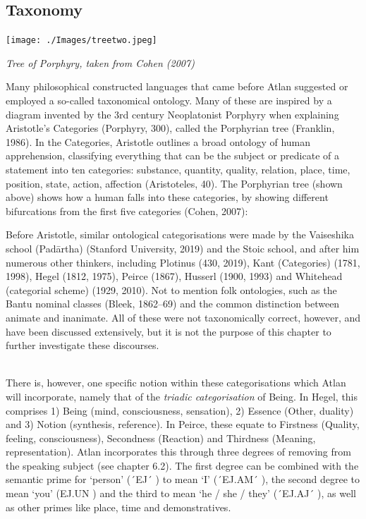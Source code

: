 \subsection{Taxonomy}

\vspace{0.3cm}
\begin{center}
\texttt{[image: ./Images/treetwo.jpeg]}

{\footnotesize \it Tree of Porphyry, taken from Cohen (2007)}
\end{center}

\noindent Many philosophical constructed languages that came before Atlan suggested or employed a so-called taxonomical ontology. Many of these are inspired by a diagram invented by the 3rd century Neoplatonist Porphyry when explaining Aristotle’s Categories (Porphyry, 300), called the Porphyrian tree (Franklin, 1986). In the Categories, Aristotle outlines a broad ontology of human apprehension, classifying everything that can be the subject or predicate of a statement into ten categories: substance, quantity, quality, relation, place, time, position, state, action, affection (Aristoteles, 40). The Porphyrian tree (shown above) shows how a human falls into these categories, by showing different bifurcations from the first five categories (Cohen, 2007): 

Before Aristotle, similar ontological categorisations were made by the Vaiseshika school (Padārtha) (Stanford University, 2019) and the Stoic school, and after him numerous other thinkers, including Plotinus (430, 2019), Kant (Categories) (1781, 1998), Hegel  (1812, 1975), Peirce (1867), Husserl (1900, 1993) and Whitehead (categorial scheme) (1929, 2010). Not to mention folk ontologies, such as the Bantu nominal classes (Bleek, 1862–69) and the common distinction between animate and inanimate. All of these were not taxonomically correct, however, and have been discussed extensively, but it is not the purpose of this chapter to further investigate these discourses.  

\phantom{.}\\

There is, however, one specific notion within these categorisations which Atlan will incorporate, namely that of the {\it triadic categorisation} of Being. In Hegel, this comprises 1) Being (mind, consciousness, sensation), 2) Essence (Other, duality) and 3) Notion (synthesis, reference). In Peirce, these equate to Firstness (Quality, feeling, consciousness), Secondness (Reaction) and Thirdness (Meaning, representation). Atlan incorporates this through three degrees of removing from the speaking subject (see chapter 6.2). The first degree can be combined with the semantic prime for ‘person’ (´EJ´ \ej) to mean ‘I’ (´EJ.AM´ \ej \am), the second degree to mean ‘you’ (EJ.UN \ej \un) and the third to mean ‘he / she / they’ (´EJ.AJ´ \ej \aj), as well as other primes like place, time and demonstratives. 

